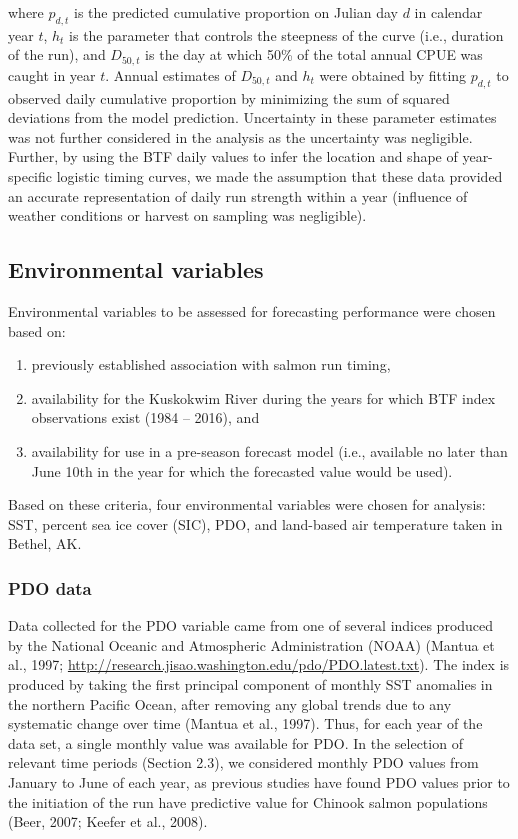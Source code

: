 \documentclass[12pt,]{book}
\providecommand{\tightlist}{%
  \setlength{\itemsep}{0pt}\setlength{\parskip}{0pt}}
\theoremstyle{definition}
\theoremstyle{definition}
\theoremstyle{definition}
\theoremstyle{remark}
\begin{document}
where \(p_{d,t}\) is the predicted cumulative proportion on Julian day
\(d\) in calendar year \(t\), \(h_t\) is the parameter that controls the
steepness of the curve (i.e., duration of the run), and \(D_{50,t}\) is
the day at which 50\% of the total annual CPUE was caught in year \(t\).
Annual estimates of \(D_{50,t}\) and \(h_t\) were obtained by fitting
\(p_{d,t}\) to observed daily cumulative proportion by minimizing the
sum of squared deviations from the model prediction. Uncertainty in
these parameter estimates was not further considered in the analysis as
the uncertainty was negligible. Further, by using the BTF daily values
to infer the location and shape of year-specific logistic timing curves,
we made the assumption that these data provided an accurate
representation of daily run strength within a year (influence of weather
conditions or harvest on sampling was negligible).

\subsection{Environmental variables}\label{environmental-variables}

Environmental variables to be assessed for forecasting performance were
chosen based on:

\begin{enumerate}
\def\labelenumi{\arabic{enumi}.}
\tightlist
\item
  previously established association with salmon run timing,
\item
  availability for the Kuskokwim River during the years for which BTF
  index observations exist (1984 -- 2016), and
\item
  availability for use in a pre-season forecast model (i.e., available
  no later than June 10th in the year for which the forecasted value
  would be used).
\end{enumerate}

Based on these criteria, four environmental variables were chosen for
analysis: SST, percent sea ice cover (SIC), PDO, and land-based air
temperature taken in Bethel, AK.

\subsubsection{PDO data}\label{pdo-data}

Data collected for the PDO variable came from one of several indices
produced by the National Oceanic and Atmospheric Administration (NOAA)
(Mantua et al., 1997;
\url{http://research.jisao.washington.edu/pdo/PDO.latest.txt}). The
index is produced by taking the first principal component of monthly SST
anomalies in the northern Pacific Ocean, after removing any global
trends due to any systematic change over time (Mantua et al., 1997).
Thus, for each year of the data set, a single monthly value was
available for PDO. In the selection of relevant time periods (Section
2.3), we considered monthly PDO values from January to June of each
year, as previous studies have found PDO values prior to the initiation
of the run have predictive value for Chinook salmon populations (Beer,
2007; Keefer et al., 2008).
\end{document}

